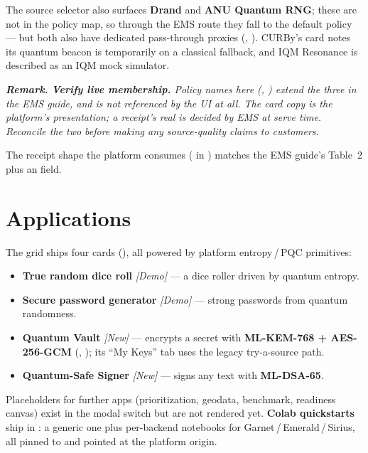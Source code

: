 \documentclass[11pt]{article}
\newenvironment{remark}
  {\par\medskip\noindent\small\itshape\textbf{\upshape Remark.}\hspace{0.4em}\ignorespaces}
  {\par\medskip}
\begin{document}
The source selector also surfaces \textbf{Drand} and \textbf{ANU Quantum RNG}; these are not in the policy map, so through
the EMS route they fall to the default policy --- but both also have dedicated pass-through proxies (,
). CURBy's card notes its quantum beacon is temporarily on a classical fallback, and IQM Resonance is
described as an IQM mock simulator.

\begin{remark}
\textbf{\upshape Verify live membership.} Policy names here (, ) extend the three in the
EMS guide, and  is not referenced by the UI at all. The card copy is the platform's
presentation; a receipt's real  is decided by EMS at serve time. Reconcile the two before making
any source-quality claims to customers.
\end{remark}

The receipt shape the platform consumes ( in ) matches the EMS guide's Table~2 plus an
 field.

\section{Applications}
The  grid ships four cards (), all powered by
platform entropy\,/\,PQC primitives:
\begin{itemize}
\item \textbf{True random dice roll} \emph{[Demo]} --- a dice roller driven by quantum entropy.
\item \textbf{Secure password generator} \emph{[Demo]} --- strong passwords from quantum randomness.
\item \textbf{Quantum Vault} \emph{[New]} --- encrypts a secret with \textbf{ML-KEM-768 + AES-256-GCM}
(, ); its ``My Keys'' tab uses the legacy 
try-a-source path.
\item \textbf{Quantum-Safe Signer} \emph{[New]} --- signs any text with \textbf{ML-DSA-65}.
\end{itemize}
Placeholders for further apps (prioritization, geodata, benchmark, readiness canvas) exist in the modal switch but are
not rendered yet. \textbf{Colab quickstarts} ship in : a generic one plus per-backend notebooks for
Garnet\,/\,Emerald\,/\,Sirius, all pinned to  and pointed at the platform origin.
\end{document}

